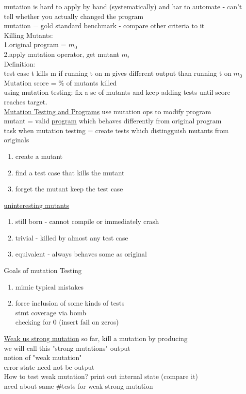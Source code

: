 \documentclass[10pt,usletter]{article}
\newcommand{\tab}[1][1cm]{\hspace*{#1}}
\begin{document}
mutation is hard to apply by hand (systematically) and har to automate - can't tell whether you actually changed the program\\
mutation = gold standard benchmark - compare other criteria to it\\
Killing Mutants: \\
1.original program = $m_0$\\
2.apply mutation operator, get mutant $m_i$\\
Definition:\\
\tab test case t kills m if running t on m gives different output than running t on $m_0$\\
Mutation score = \% of mutants killed\\
using mutation testing: fix a se of mutants and keep adding tests until score reaches target.\\
\underline{Mutation Testing and Programs}
use mutation ops to modify program\\
mutant = valid \underline{program} which behaves differently from original program\\
task when mutation testing = create tests which distingguish mutants from originals\\

\begin{enumerate}
\item create a mutant
\item find a test case that kills the mutant
\item forget the mutant keep the test case
\end{enumerate}

\underline{uninteresting mutants}
\begin{enumerate}
\item still born - cannot compile or immediately crash
\item trivial - killed by almost any test case
\item equivalent - always behaves some as original
\end{enumerate}
Goals of mutation Testing
\begin{enumerate}
\item mimic typical mistakes
\item force inclusion of some kinds of tests\\
\tab stmt coverage via bomb\\
\tab checking for 0 (insert fail on zeros)
\end{enumerate}
\underline{Weak us strong mutation}
so far, kill a mutation by producing\\
\tab we will call this "strong mutations" output\\
notion of "weak mutation"\\
\tab error state need not be output
\\
How to test weak mutation?
print out internal state (compare it)\\
need about same \#tests for weak strong mutation
\end{document}
